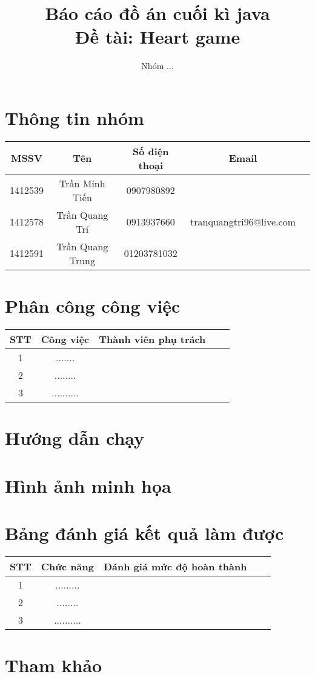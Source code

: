 \documentclass[12pt]{article}
\author{Nhóm ...}
\begin{document}
\title{Báo cáo đồ án cuối kì java\\Đề tài:  Heart game}
\maketitle
\tableofcontents
\pagebreak
\section{Thông tin nhóm}
\begin{tabularx}{\textwidth}{|c|c|c|cX|}
\hline
MSSV & Tên & Số điện thoại & Email \\ \hline
1412539 & Trần Minh Tiến & 0907980892  &   \\
1412578  & Trần Quang Trí & 0913937660 & tranquangtri96@live.com \\
1412591  & Trần Quang Trung & 01203781032 &  \\
\hline
\end{tabularx}

\section{Phân công công việc}
\begin{tabularx}{\textwidth}{|c|c|c|cX|}
\hline
STT & Công việc & Thành viên phụ trách \\ \hline
1 & ....... &    \\
2  & ........ &    \\
3  & .......... &    \\
\hline
\end{tabularx}

\section{Hướng dẫn chạy}

\section{Hình ảnh minh họa}

\section{Bảng đánh giá kết quả làm được}
\begin{tabularx}{\textwidth}{|c|c|c|cX|}
\hline
STT & Chức năng & Đánh giá mức độ hoàn thành \\ \hline
1 & ......... &    \\
2  & ........ &    \\
3  & .......... &    \\
\hline
\end{tabularx}

\section{Tham khảo}
\end{document}
